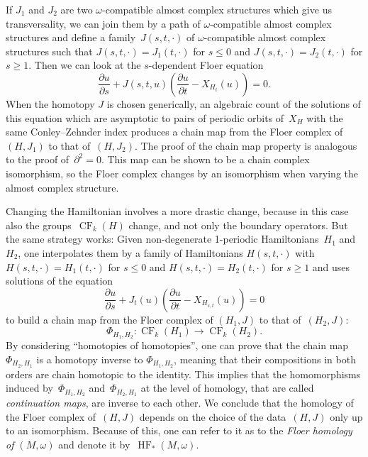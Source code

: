 \documentclass[12pt,twoside]{amsart}
\theoremstyle{plain}
\numberwithin{figure}{section}
\numberwithin{equation}{section}
\def\CF{\operatorname{CF}}
\def\HF{\operatorname{HF}}
\begin{document}
If $J_1$ and $J_2$ are two $\omega$-compatible almost complex structures which give us transversality, 
we can join them by a path of $\omega$-compatible almost complex structures and define 
a family~$J(s,t,\cdot)$ of $\omega$-compatible almost complex structures such that 
$J(s,t,\cdot) = J_1(t,\cdot)$ for $s \leqslant 0$ and $J(s,t,\cdot) = J_2(t,\cdot)$ for $s\geqslant 1$. 
Then we can look at the $s$-dependent Floer equation
\[
\frac{\partial u}{\partial s} + J(s,t,u) \left( \frac{\partial u}{\partial t} - X_{H_t}(u) \right) = 0.
\]
When the homotopy $J$ is chosen generically, an algebraic count of the solutions of this equation which are asymptotic to pairs of periodic orbits of~$X_H$ with the same Conley--Zehnder index produces a chain map 
from the Floer complex of~$(H,J_1)$ to that of~$(H,J_2)$. The proof of the chain map property is analogous 
to the proof of~$\partial^2=0$. This map can be shown to be a chain complex isomorphism, 
so the Floer complex changes by an isomorphism when varying the almost complex structure.

Changing the Hamiltonian involves a more drastic change, because in this case also the groups~$\CF_k(H)$ change, and not only the boundary operators. But the same strategy works: 
Given non-degenerate 1-periodic Hamiltonians~$H_1$ and~$H_2$, one interpolates them by a family of Hamiltonians $H(s,t,\cdot)$ with $H(s,t,\cdot) = H_1(t,\cdot)$ for $s \leqslant 0$ and 
$H(s,t,\cdot) = H_2(t,\cdot)$ for $s \geqslant 1$ and uses solutions of the equation
%
\begin{equation} \label{floer.s}
\frac{\partial u}{\partial s} + J_t(u) \left( \frac{\partial u}{\partial t} - X_{H_{s,t}}(u) \right) = 0
\end{equation}
to build a chain map from the Floer complex of $(H_1,J)$ to that of~$(H_2,J)$:
\[
\Phi_{H_1,H_2} \colon \CF_k(H_1) \rightarrow \CF_k(H_2) .
\]
By considering ``homotopies of homotopies'', one can prove that the chain map $\Phi_{H_2,H_1}$ 
is a homotopy inverse to $\Phi_{H_1,H_2}$, meaning that their compositions in both orders are 
chain homotopic to the identity. This implies that the homomorphisms induced by~$\Phi_{H_1,H_2}$ 
and~$\Phi_{H_2,H_1}$ at the level of homology,
that are called {\it continuation maps},
are inverse to each other. We conclude that the homology 
of the Floer complex of~$(H,J)$ depends on the choice of the data~$(H,J)$ only up to an isomorphism. 
Because of this, one can refer to it as to the {\em Floer homology of $(M,\omega)$}\/ 
and denote it by~$\HF_*(M,\omega)$.
\end{document}

